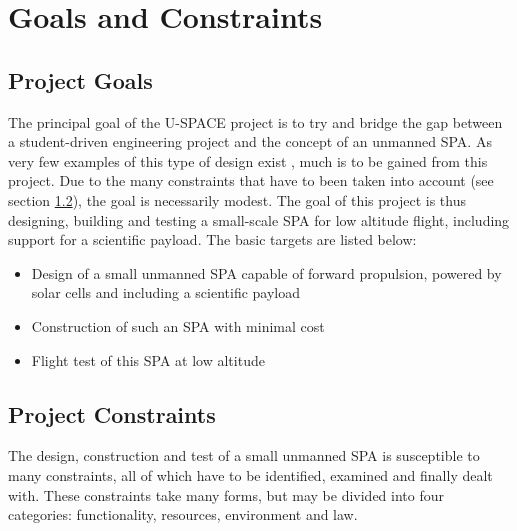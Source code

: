 \chapter{Goals and Constraints}
\label{chap:goals_constraints}
%
\section{Project Goals}
\label{sec:goals}
%
The principal goal of the \ac{U-SPACE} project is to try and bridge the gap between a student-driven engineering project and the concept of an unmanned \ac{SPA}. As very few examples of this type of design exist \cite{website:solr}, much is to be gained from this project. Due to the many constraints that have to been taken into account (see section \ref{sec:constraints}), the goal is necessarily modest. The goal of this project is thus designing, building and testing a small-scale \ac{SPA} for low altitude flight, including support for a scientific payload. The basic targets are listed below:
%
\begin{itemize}
\item Design of a small unmanned \ac{SPA} capable of forward propulsion, powered by solar cells and including a scientific payload
\item Construction of such an \ac{SPA} with minimal cost
\item Flight test of this \ac{SPA} at low altitude
\end{itemize}
%
\section{Project Constraints}
\label{sec:constraints}
%
The design, construction and test of a small unmanned \ac{SPA} is susceptible to many constraints, all of which have to be identified, examined and finally dealt with. These constraints take many forms, but may be divided into four categories: functionality, resources, environment and law.
%
